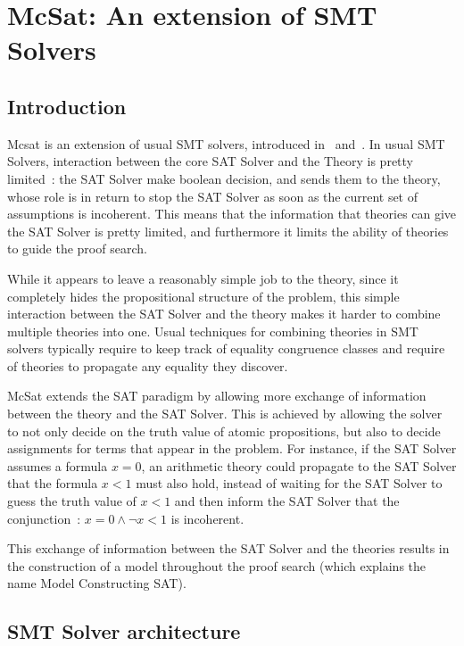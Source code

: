 
\section{McSat: An extension of SMT Solvers}

\subsection{Introduction}


Mcsat is an extension of usual SMT solvers, introduced in~\cite{VMCAI13} and~\cite{FMCAD13}.
In usual SMT Solvers, interaction between the core SAT Solver and the Theory is pretty limited~:
the SAT Solver make boolean decision, and sends them to the theory, whose role is in return to
stop the SAT Solver as soon as the current set of assumptions is incoherent. This means
that the information that theories can give the SAT Solver is pretty limited, and furthermore
it limits the ability of theories to guide the proof search.

While it appears to leave a reasonably simple job to the theory, since it completely
hides the propositional structure of the problem, this simple interaction between the
SAT Solver and the theory makes it harder to combine multiple theories into one. Usual
techniques for combining theories in SMT solvers typically require to keep track of
equality congruence classes and require of theories to propagate any equality they discover.

McSat extends the SAT paradigm by allowing more exchange of information between the theory
and the SAT Solver. This is achieved by allowing the solver to not only decide on the truth value
of atomic propositions, but also to decide assignments for terms that appear in the problem.
For instance, if the SAT Solver assumes a formula $x = 0$,
an arithmetic theory could propagate to the SAT Solver that the formula $x < 1$ must also hold,
instead of waiting for the SAT Solver to guess the truth value of $x < 1$ and then
inform the SAT Solver that the conjunction~: $x = 0 \land \neg x < 1$ is incoherent.

This exchange of information between the SAT Solver and the theories results in
the construction of a model throughout the proof search (which explains the name
Model Constructing SAT).

\subsection{SMT Solver architecture}

